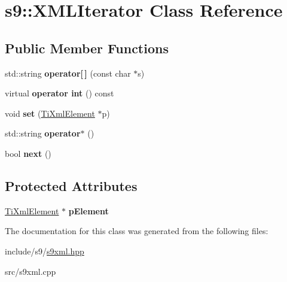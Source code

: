 \hypertarget{classs9_1_1XMLIterator}{\section{s9\-:\-:\-X\-M\-L\-Iterator \-Class \-Reference}
\label{classs9_1_1XMLIterator}
}
\subsection*{\-Public \-Member \-Functions}
\begin{DoxyCompactItemize}
\item 
\hypertarget{classs9_1_1XMLIterator_a8e6c3bfbbf48c80d5a0600bb037a08c2}{std\-::string {\bfseries operator\mbox{[}$\,$\mbox{]}} (const char $\ast$s)}\label{classs9_1_1XMLIterator_a8e6c3bfbbf48c80d5a0600bb037a08c2}

\item 
\hypertarget{classs9_1_1XMLIterator_a128e571d94d1518d3285a2265b49b296}{virtual {\bfseries operator int} () const }\label{classs9_1_1XMLIterator_a128e571d94d1518d3285a2265b49b296}

\item 
\hypertarget{classs9_1_1XMLIterator_afe47290dd4e84f7f6c5638394a84a665}{void {\bfseries set} (\hyperlink{classTiXmlElement}{\-Ti\-Xml\-Element} $\ast$p)}\label{classs9_1_1XMLIterator_afe47290dd4e84f7f6c5638394a84a665}

\item 
\hypertarget{classs9_1_1XMLIterator_a7cfd35c3a47c3819c78ea5d43381f762}{std\-::string {\bfseries operator$\ast$} ()}\label{classs9_1_1XMLIterator_a7cfd35c3a47c3819c78ea5d43381f762}

\item 
\hypertarget{classs9_1_1XMLIterator_ad3381f5be098ca5155a14aedda1f3496}{bool {\bfseries next} ()}\label{classs9_1_1XMLIterator_ad3381f5be098ca5155a14aedda1f3496}

\end{DoxyCompactItemize}
\subsection*{\-Protected \-Attributes}
\begin{DoxyCompactItemize}
\item 
\hypertarget{classs9_1_1XMLIterator_a24844758c192fee227856c853db888b1}{\hyperlink{classTiXmlElement}{\-Ti\-Xml\-Element} $\ast$ {\bfseries p\-Element}}\label{classs9_1_1XMLIterator_a24844758c192fee227856c853db888b1}

\end{DoxyCompactItemize}


\-The documentation for this class was generated from the following files\-:\begin{DoxyCompactItemize}
\item 
include/s9/\hyperlink{s9xml_8hpp}{s9xml.\-hpp}\item 
src/s9xml.\-cpp\end{DoxyCompactItemize}
